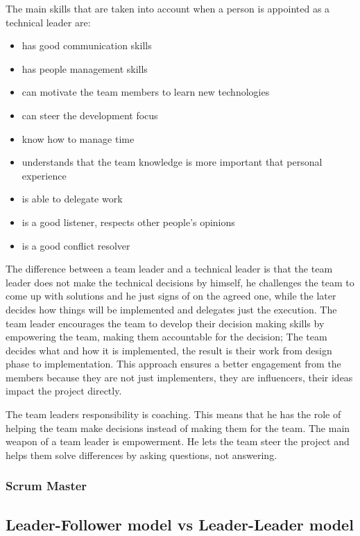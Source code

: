 The main skills that are taken into account when a person is appointed as a technical leader are:

\begin{itemize}
\item has good communication skills
\item has people management skills
\item can motivate the team members to learn new technologies
\item can steer the development focus
\item know how to manage time
\item understands that the team knowledge is more important that personal experience
\item is able to delegate work
\item is a good listener, respects other people's opinions
\item is a good conflict resolver
\end{itemize}

The difference between a team leader and a technical leader is that the team leader does not make the technical decisions by himself, he challenges the team to come up with solutions and he just signs of on the agreed one, while the later decides how things will be implemented and delegates just the execution. The team leader encourages the team to develop their decision making skills by empowering the team, making them accountable for the decision; The team decides what and how it is implemented, the result is their work from design phase to implementation. This approach ensures a better engagement from the members because they are not just implementers, they are influencers, their ideas impact the project directly.

The team leaders responsibility is coaching. This means that he has the role of helping the team make decisions instead of making them for the team. The main weapon of a team leader is empowerment. He lets the team steer the project and helps them solve differences by asking questions, not answering.

\subsubsection{Scrum Master}

\subsection{Leader-Follower model vs Leader-Leader model}

